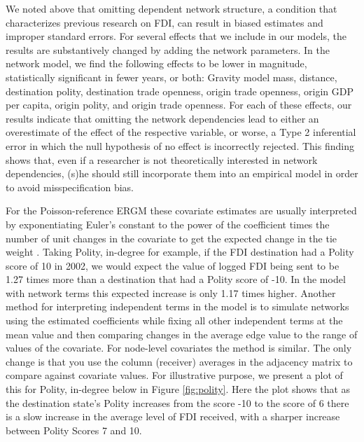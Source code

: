 \documentclass[reqno,onecolumn,letterpaper,12pt]{article}
\begin{document}
We noted above that omitting dependent network structure, a condition that characterizes previous research on FDI, can result in biased estimates and improper standard errors. For several effects that we include in our models, the results are substantively changed by adding the network parameters. In the network model, we find the following effects to be lower in magnitude, statistically significant in fewer years, or both: Gravity model mass, distance, destination polity, destination trade openness, origin trade openness, origin GDP per capita, origin polity, and origin trade openness. For each of these effects, our results indicate that omitting the network dependencies lead to either an overestimate of the effect of the respective variable, or worse, a Type 2 inferential error in which the null hypothesis of no effect is incorrectly rejected. This finding shows that, even if a researcher is not theoretically interested in network dependencies, (s)he should still incorporate them into an empirical model in order to avoid misspecification bias.



For the Poisson-reference ERGM these covariate estimates are usually interpreted by exponentiating Euler's constant to the power of the coefficient times the number of unit changes in the covariate to get the expected change in the tie weight \citep{krivitsky2013modeling}. Taking Polity, in-degree for example, if the FDI destination had a Polity score of 10 in 2002, we would expect the value of logged FDI being sent to be 1.27 times more than a destination that had a Polity score of -10. In the model with network terms this expected increase is only 1.17 times higher. Another method for interpreting independent terms in the model is to simulate networks using the estimated coefficients while fixing all other independent terms at the mean value and then comparing changes in the average edge value to the range of values of the covariate. For node-level covariates the method is similar. The only change is that you use the column (receiver) averages in the adjacency matrix to compare against covariate values. For illustrative purpose, we present a plot of this for Polity, in-degree below in Figure \ref{fig:polity}. Here the plot shows that as the destination state's Polity increases from the score -10 to the score of 6 there is a slow increase in the average level of FDI received, with a sharper increase between Polity Scores 7 and 10. 
\end{document}
